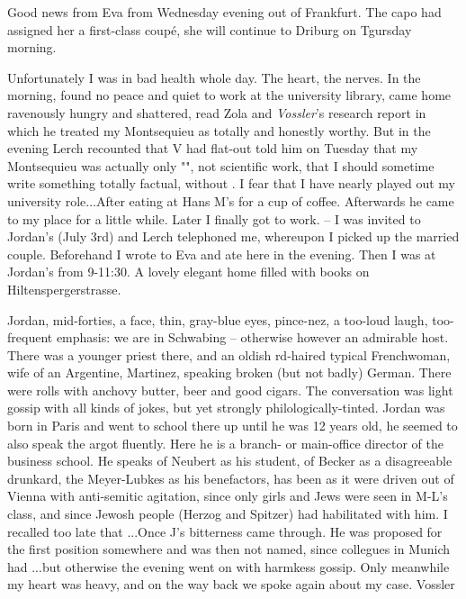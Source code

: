
Good news from Eva from Wednesday evening out of Frankfurt. The capo had assigned her a first-class coupé, she will continue to Driburg on Tgursday morning.

Unfortunately I was in bad health whole day. The heart, the nerves. In the morning, found no peace and quiet to work at the university library, came home ravenously hungry and shattered, read Zola and \textit{Vossler}'s research report in which he treated my Montsequieu as totally and honestly worthy. But in the evening Lerch recounted that V had flat-out told him on Tuesday that my Montsequieu was actually only "", not scientific work, that I should sometime write something totally factual, without . I fear that I have nearly played out my university role...After eating at Hans M's for a cup of coffee. Afterwards he came to my place for a little while. Later I finally got to work. \missing -- I was invited to Jordan's (July 3rd) and Lerch telephoned me, whereupon I picked up the married couple. Beforehand I wrote to Eva and ate here in the evening. Then I was at Jordan's from 9-11:30. A lovely elegant home filled with books on Hiltenspergerstrasse.

Jordan, mid-forties, a  face, thin, gray-blue eyes, pince-nez, a too-loud laugh, too-frequent emphasis: we are in Schwabing -- otherwise however an admirable host. There was a younger priest there, and an oldish rd-haired typical Frenchwoman, wife of an Argentine, Martinez, speaking broken (but not badly) German. There were rolls with anchovy butter, beer and good cigars. The conversation was light gossip with all kinds of jokes, but yet strongly philologically-tinted. Jordan was born in Paris and went to school there up until he was 12 years old, he seemed to also speak the argot fluently. Here he is a branch- or main-office director of the business school. He speaks of Neubert as his student, of Becker as a disagreeable drunkard, the Meyer-Lubkes as his benefactors, has been as it were driven out of Vienna with anti-semitic agitation, since only girls and Jews were seen in M-L's class, and since Jewosh people (Herzog and Spitzer) had habilitated with him. I recalled too late that ...Once J's bitterness came through. He was proposed for the first position somewhere and was then not named, since collegues in Munich had ...but otherwise the evening went on with harmkess gossip. Only meanwhile my heart was heavy, and on the way back we spoke again about my case. Vossler 